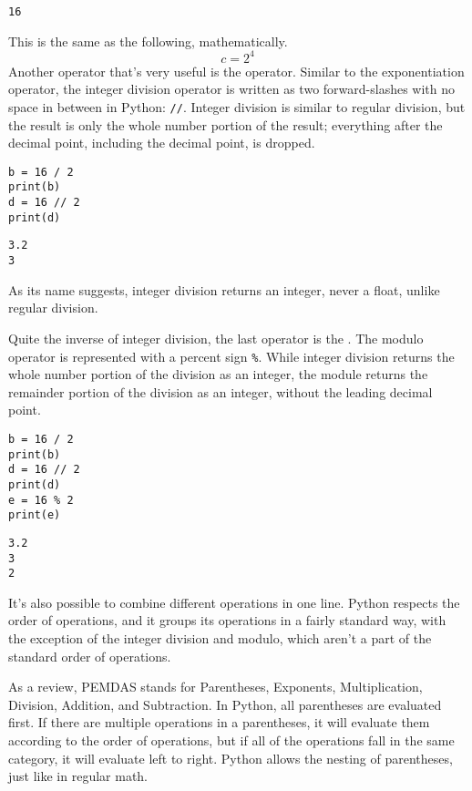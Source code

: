 \begin{lstlisting}[style=none]
16
\end{lstlisting}
This is the same as the following, mathematically.
$$
c = 2^4
$$
Another operator that's very useful is the  operator. Similar to the exponentiation operator, the integer division operator is written as two forward-slashes with no space in between in Python: \verb|//|. Integer division is similar to regular division, but the result is only the whole number portion of the result; everything after the decimal point, including the decimal point, is dropped.\par
\begin{lstlisting}[style=pippython]
b = 16 / 2
print(b)
d = 16 // 2
print(d)
\end{lstlisting}
\begin{lstlisting}[style=none]
3.2
3
\end{lstlisting}
As its name suggests, integer division returns an integer, never a float, unlike regular division.\par
Quite the inverse of integer division, the last operator is the . The modulo operator is represented with a percent sign \verb|%|. While integer division returns the whole number portion of the division as an integer, the module returns the remainder portion of the division as an integer, without the leading decimal point.\par
\begin{lstlisting}[style=pippython]
b = 16 / 2
print(b)
d = 16 // 2
print(d)
e = 16 % 2
print(e)
\end{lstlisting}
\begin{lstlisting}[style=none]
3.2
3
2
\end{lstlisting}
It's also possible to combine different operations in one line. Python respects the order of operations, and it groups its operations in a fairly standard way, with the exception of the integer division and modulo, which aren't a part of the standard order of operations.\par
As a review, PEMDAS stands for Parentheses, Exponents, Multiplication, Division, Addition, and Subtraction. In Python, all parentheses are evaluated first. If there are multiple operations in a parentheses, it will evaluate them according to the order of operations, but if all of the operations fall in the same category, it will evaluate left to right. Python allows the nesting of parentheses, just like in regular math.\par
